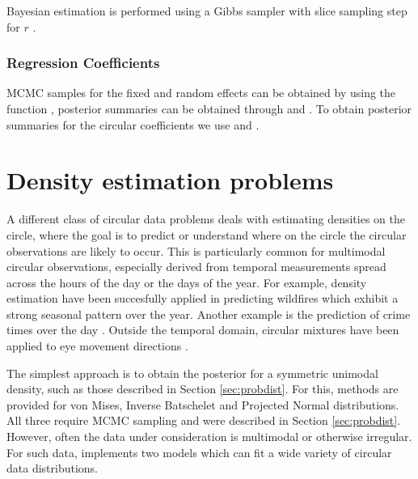 Bayesian estimation is performed using a Gibbs sampler with slice
sampling step for \(r\) \citep{hernandez2017general}.

\hypertarget{regression-coefficients-1}{%
\subsubsection{Regression
Coefficients}\label{regression-coefficients-1}}

MCMC samples for the fixed and random effects can be obtained by using
the function , posterior summaries can be
obtained through  and . To obtain
posterior summaries for the circular coefficients
\citep{longitudinalpaper} we use  and
.

\hypertarget{density-estimation-problems}{%
\section{Density estimation
problems}\label{density-estimation-problems}}

\label{densest}

A different class of circular data problems deals with estimating
densities on the circle, where the goal is to predict or understand
where on the circle the circular observations are likely to occur. This
is particularly common for multimodal circular observations, especially
derived from temporal measurements spread across the hours of the day or
the days of the year. For example, density estimation have been
succesfully applied in predicting wildfires
\citep{ameijeiras2018directional, ley2018applied} which exhibit a strong
seasonal pattern over the year. Another example is the prediction of
crime times over the day \citep{ashby2013comparison}. Outside the
temporal domain, circular mixtures have been applied to eye movement
directions \citep{van2016infants}.

The simplest approach is to obtain the posterior for a symmetric
unimodal density, such as those described in Section \ref{sec:probdist}.
For this, methods are provided for von Mises, Inverse Batschelet and
Projected Normal distributions. All three require MCMC sampling and were
described in Section \ref{sec:probdist}. However, often the data under
consideration is multimodal or otherwise irregular. For such data,
 implements two models which can fit a wide variety of
circular data distributions.

